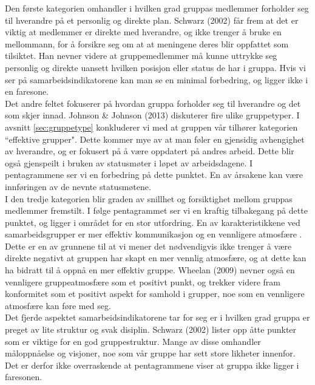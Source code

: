 Den første kategorien omhandler i hvilken grad gruppas medlemmer forholder seg til hverandre på et personlig og direkte plan. Schwarz (2002)\cite{fasilitator} får frem at det er viktig at medlemmer er direkte med hverandre, og ikke trenger å bruke en mellommann, for å forsikre seg om at at meningene deres blir oppfattet som tilsiktet. Han nevner videre at gruppemedlemmer må kunne uttrykke seg personlig og direkte uansett hvilken posisjon eller status de har i gruppa. Hvis vi ser på samarbeidsindikatorene kan man se en minimal forbedring, og ligger ikke i en faresone.\\

Det andre feltet fokuserer på hvordan gruppa forholder seg til hverandre og det som skjer innad. Johnson \& Johnson (2013)\cite{gruppeteori} diskuterer fire ulike gruppetyper. I avsnitt \ref{sec:gruppetype} konkluderer vi med at gruppen vår tilhører kategorien ``effektive grupper". Dette kommer mye av at man føler en gjensidig avhengighet av hverandre, og er fokusert på å være oppdatert på andres arbeid. Dette blir også gjenspeilt i bruken av statusmøter i løpet av arbeidsdagene. I pentagrammene ser vi en forbedring på dette punktet. En av årsakene kan være innføringen av de nevnte statusmøtene.\\

I den tredje kategorien blir graden av snillhet og forsiktighet mellom gruppas medlemmer fremstilt. I følge pentagrammet ser vi en kraftig tilbakegang på dette punktet, og ligger i området for en stor utfordring. En av karakteristikkene ved samarbeidsgrupper er mer effektiv kommunikasjon og en vennligere atmosfære \cite{fasilitator}. Dette er en av grunnene til at vi mener det nødvendigvis ikke trenger å være direkte negativt at gruppen har skapt en mer vennlig atmosfære, og at dette kan ha bidratt til å oppnå en mer effektiv gruppe. Wheelan (2009)\cite{effectiveTeams} nevner også en vennligere gruppeatmosfære som et positivt punkt, og trekker videre fram konformitet som et positivt aspekt for samhold i grupper, noe som en vennligere atmosfære kan føre med seg.\\

Det fjerde aspektet samarbeidsindikatorene tar for seg er i hvilken grad gruppa er preget av lite struktur og svak disiplin. Schwarz (2002)\cite{fasilitator} lister opp åtte punkter som er viktige for en god gruppestruktur. Mange av disse omhandler måloppnåelse og visjoner, noe som vår gruppe har sett store likheter innenfor. Det er derfor ikke overraskende at pentagrammene viser at gruppa ikke ligger i faresonen.\\

